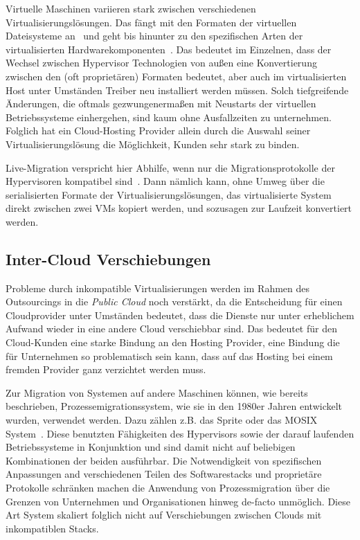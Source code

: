 Virtuelle Maschinen variieren stark zwischen verschiedenen
Virtualisierungslösungen. Das fängt mit den Formaten der virtuellen
Dateisysteme an~\cite{none} und geht bis hinunter zu den spezifischen
Arten der virtualisierten Hardwarekomponenten~\cite{none}. Das
bedeutet im Einzelnen, dass der Wechsel zwischen Hypervisor
Technologien von außen eine Konvertierung zwischen den (oft
proprietären) Formaten bedeutet, aber auch im virtualisierten Host
unter Umständen Treiber neu installiert werden müssen. Solch
tiefgreifende Änderungen, die oftmals gezwungenermaßen mit Neustarts
der virtuellen Betriebssysteme einhergehen, sind kaum ohne
Ausfallzeiten zu unternehmen. Folglich hat ein Cloud-Hosting Provider
allein durch die Auswahl seiner Virtualisierungslösung die
Möglichkeit, Kunden sehr stark zu binden.

Live-Migration verspricht hier Abhilfe, wenn nur die
Migrationsprotokolle der Hypervisoren kompatibel
sind~\cite{none}. Dann nämlich kann, ohne Umweg über die
serialisierten Formate der Virtualisierungslösungen, das
virtualisierte System direkt zwischen zwei VMs kopiert werden, und
sozusagen zur Laufzeit konvertiert werden.

\subsection{Inter-Cloud Verschiebungen}
\label{sec:movclouds}
Probleme durch inkompatible Virtualisierungen werden im Rahmen des
Outsourcings in die \emph{Public Cloud} noch verstärkt, da die
Entscheidung für einen Cloudprovider unter Umständen bedeutet, dass
die Dienste nur unter erheblichem Aufwand wieder in eine andere Cloud
verschiebbar sind. Das bedeutet für den Cloud-Kunden eine starke
Bindung an den Hosting Provider, eine Bindung die für Unternehmen so
problematisch sein kann, dass auf das Hosting bei einem fremden
Provider ganz verzichtet werden muss.

Zur Migration von Systemen auf andere Maschinen können, wie bereits
beschrieben, Prozessemigrationssystem, wie sie in den 1980er Jahren
entwickelt wurden, verwendet werden. Dazu zählen z.B. das Sprite oder
das MOSIX System~\cite{hansen2004self}. Diese benutzten Fähigkeiten
des Hypervisors sowie der darauf laufenden Betriebssysteme in
Konjunktion und sind damit nicht auf beliebigen Kombinationen der
beiden ausführbar. Die Notwendigkeit von spezifischen Anpassungen and
verschiedenen Teilen des Softwarestacks und proprietäre Protokolle
schränken machen die Anwendung von Prozessmigration über die Grenzen
von Unternehmen und Organisationen hinweg de-facto unmöglich. Diese
Art System skaliert folglich nicht auf Verschiebungen zwischen Clouds
mit inkompatiblen Stacks.

